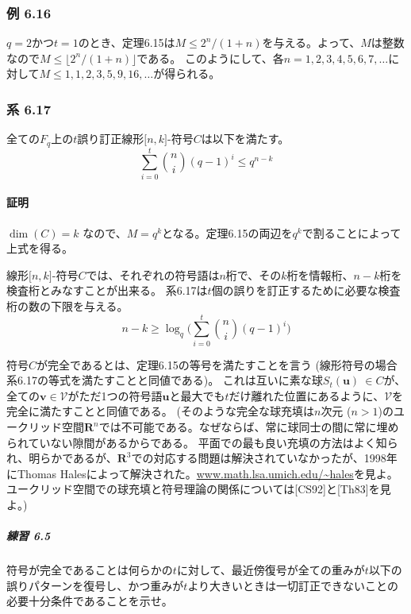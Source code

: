 \documentclass[12pt,a4paper]{article}
\begin{document}
    \subsubsection*{例 6.16}

      $q = 2$かつ$t = 1$のとき、定理6.15は$M \leq 2^n / (1 + n)$を与える。よって、$M$は整数なので$M \leq \lfloor 2^n / (1 + n) \rfloor$である。
      このようにして、各$n = 1,2,3,4,5,6,7, \dots$に対して$M \leq 1, 1, 2, 3, 5 ,9, 16, \dots$が得られる。
  
    \subsubsection*{系 6.17}

      全ての$F_q$上の$t$誤り訂正線形$\lbrack n, k \rbrack$-符号$C$は以下を満たす。
      \[ \sum_{i=0}^t \binom{n}{i} {(q - 1)}^i \leq q^{n-k} \]
    
      \paragraph{証明}

        $\dim (C) = k$ なので、$M = q^k$となる。定理6.15の両辺を$q^k$で割ることによって上式を得る。

      線形$\lbrack n, k \rbrack$-符号$C$では、それぞれの符号語は$n$桁で、その$k$桁を情報桁、$n - k$桁を検査桁とみなすことが出来る。
      系6.17は$t$個の誤りを訂正するために必要な検査桁の数の下限を与える。
      \[n - k \geq \log_q \big( \sum_{i=0}^t \binom{n}{i} {(q - 1)}^i \big) \]
    
    符号$C$が完全であるとは、定理6.15の等号を満たすことを言う (線形符号の場合系6.17の等式を満たすことと同値である)。
    これは互いに素な球$S_t(\mathbf{u}) \ \in C$が、全ての$\mathbf{v} \in \mathcal{V}$がただ1つの符号語$\mathbf{u}$と最大でも$t$だけ離れた位置にあるように、$\mathcal{V}$を完全に満たすことと同値である。
    (そのような完全な球充填は$n$次元 ($n > 1$)のユークリッド空間$\mathbf{R}^n$では不可能である。なぜならば、常に球同士の間に常に埋められていない隙間があるからである。
      平面での最も良い充填の方法はよく知られ、明らかであるが、$\mathbf{R}^3$での対応する問題は解決されていなかったが、1998年にThomas Halesによって解決された。\href{http://www.math.lsa.umich.edu/~hales}{www.math.lsa.umich.edu/\~{}hales}を見よ。
    ユークリッド空間での球充填と符号理論の関係については[CS92]と[Th83]を見よ。)

      \subparagraph{練習 6.5}

        符号が完全であることは何らかの$t$に対して、最近傍復号が全ての重みが$t$以下の誤りパターンを復号し、かつ重みが$t$より大きいときは一切訂正できないことの必要十分条件であることを示せ。
\end{document}
